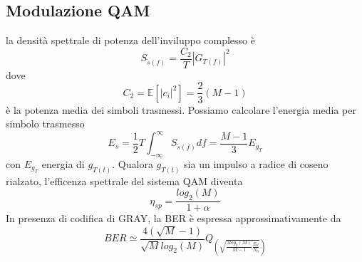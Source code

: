     \subsection{Modulazione QAM}
        la densità spettrale di potenza dell'inviluppo complesso è 
        \[
            S_{\tilde{s}(f)} = \frac{C_2}{T}\left|G_{T(f)}\right|^2    
        \]
        dove 
        \[
            C_2 = \mathbb{E}[\left|c_i\right|^2] = \frac{2}{3}(M-1)    
        \]
        è la potenza media dei simboli trasmessi. Possiamo calcolare l'energia media per simbolo trasmesso
        \[
            E_s = \frac{1}{2}T\int_{-\infty}^{\infty}S_{\tilde{s}(f)} df = \frac{M-1}{3}E_{g_T}
        \]
        con $E_{g_T}$ energia di $g_{T(t)}$. Qualora $g_{T(t)}$ sia un impulso a radice di coseno rialzato, l'efficenza spettrale del 
        sistema QAM diventa 
        \[
            \eta_{sp} = \frac{log_2(M)}{1+\alpha}  
        \]
        In presenza di codifica di GRAY, la BER è espressa approssimativamente da 
        \[
            BER \simeq \frac{4(\sqrt{M}-1)}{\sqrt{M}log_2(M)}Q_{\displaystyle \left(\sqrt{\frac{3log_2(M)}{M-1}\frac{E_d}{N_0}}\right)}  
        \]
